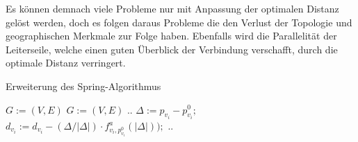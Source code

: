 Es können demnach viele Probleme nur mit Anpassung der optimalen Distanz gelöst werden, doch es folgen daraus Probleme die den Verlust der Topologie und geographischen Merkmale zur Folge haben. Ebenfalls wird die Parallelität der Leiterseile, welche einen guten Überblick der Verbindung verschafft, durch die optimale Distanz verringert. \\

\begin{algorithm}[t]
	\centering
	\caption[Erweiterung des Spring-Algorithmus]{Erweiterung des Spring-Algorithmus} \label{algo_2}
	\begin{algorithmic}[1]
		\REQUIRE \begin{math} G:= (V,E) \end{math}
		\ENSURE \begin{math} G:= (V,E) \end{math}
		\STATE ..
		\newline
		\STATE $\Delta := p_{v_{i}} - p^{0}_{v_{i}};$
		\STATE $d_{v_{i}} := d_{v_{i}} - (\Delta / |\Delta|) \cdot f^{a}_{v_{i},p^{0}_{v_{i}}}(|\Delta|));$
		\ENDFOR
		\newline
		\STATE ..
		\ENDFOR
	\end{algorithmic}
\end{algorithm}


